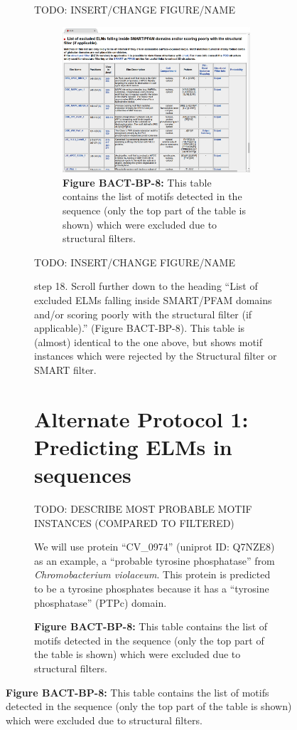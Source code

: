 {\begin{figure}[h!]
{{\begin{figure}[h!]
{{TODO: INSERT/CHANGE FIGURE/NAME

\begin{figure}[h!]
\centering
\includegraphics[width=\textwidth]{Figures/TP53_1/elm_results_motifs_filtered.png}
\caption{
\textbf{Figure BACT-BP-8:} This table contains the list of motifs
detected in the sequence (only the top part of the table is shown) which
were excluded due to structural filters.
}
\end{figure}

TODO: INSERT/CHANGE FIGURE/NAME

step 18. Scroll further down to the heading ``List of excluded ELMs
falling inside SMART/PFAM domains and/or scoring poorly with the
structural filter (if applicable).'' (Figure BACT-BP-8). This table is
(almost) identical to the one above, but shows motif instances which
were rejected by the Structural filter or SMART filter.

\section{Alternate Protocol 1: Predicting ELMs in
sequences}\label{alternate-protocol-1-predicting-elms-in-sequences}

TODO: DESCRIBE MOST PROBABLE MOTIF INSTANCES (COMPARED TO FILTERED)

We will use protein ``CV\_0974'' (uniprot ID: Q7NZE8) as an example, a
``probable tyrosine phosphatase'' from \emph{Chromobacterium violaceum}.
This protein is predicted to be a tyrosine phosphates because it has a
``tyrosine phosphatase'' (PTPc) domain.

}}
\end{figure}}}
\end{figure}}

